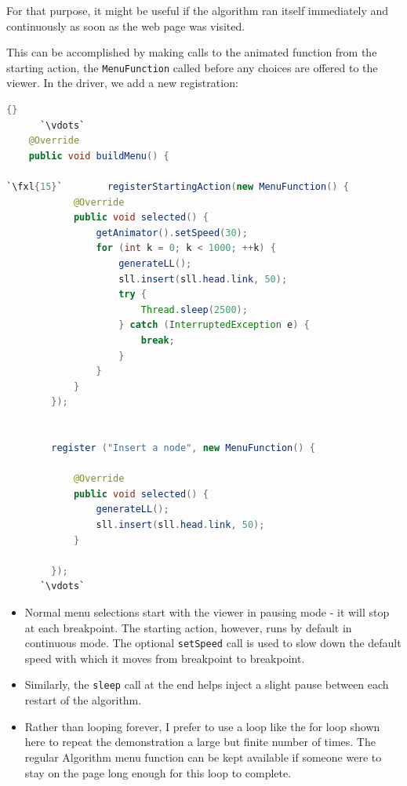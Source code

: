 \documentclass[11pt,titlepage]{book}
\def\fxl#1{%
\newdimen\fxlheight\setlength{\fxlheight}{#1\baselineskip}%
\advance\fxlheight by -0.5\baselineskip%
\begin{picture}(0,0)%
\setlength{\unitlength}{\baselineskip}%
\put(0,0){\makebox(0,0.75)[tl]{%
\colorbox{paleyellow}{%
\rule{0pt}{\fxlheight}%
\rule{\linewidth}{0pt}}%
}}\end{picture}%
}
\begin{document}
For that purpose, it might be useful if the algorithm ran 
itself immediately and continuously as soon as the web page was visited.

This can be accomplished by making calls to the animated function from
the starting action, the \texttt{MenuFunction} called before any
choices are offered to the viewer. In the driver, we add a new registration:
\begin{lstlisting}[language=Java,frame=tb]{}
      `\vdots`
    @Override
    public void buildMenu() {

`\fxl{15}`        registerStartingAction(new MenuFunction() {
            @Override
            public void selected() {
                getAnimator().setSpeed(30);
                for (int k = 0; k < 1000; ++k) {
                    generateLL();                    
                    sll.insert(sll.head.link, 50);
                    try {
                        Thread.sleep(2500);
                    } catch (InterruptedException e) {
                        break;
                    }
                }
            }    
        });

        
        register ("Insert a node", new MenuFunction() {

            @Override
            public void selected() {
                generateLL();                    
                sll.insert(sll.head.link, 50);
            }
            
        });
      `\vdots`
\end{lstlisting}
\begin{itemize}
\item Normal menu selections start with the viewer in pausing mode -
  it will stop at each breakpoint. The starting action, however, runs
  by default in continuous mode. The optional \texttt{setSpeed} call
  is used to slow down the default speed with which it moves from
  breakpoint to breakpoint.

\item  Similarly, the \texttt{sleep} call at the end helps inject a 
  slight pause between each restart of the algorithm.

\item Rather than looping forever, I prefer to use a loop like the for loop shown here to repeat the demonstration a large but finite number of times. The regular Algorithm menu function can be kept available if someone were to stay on the page long enough for this loop to complete.
\end{itemize}
\end{document}
